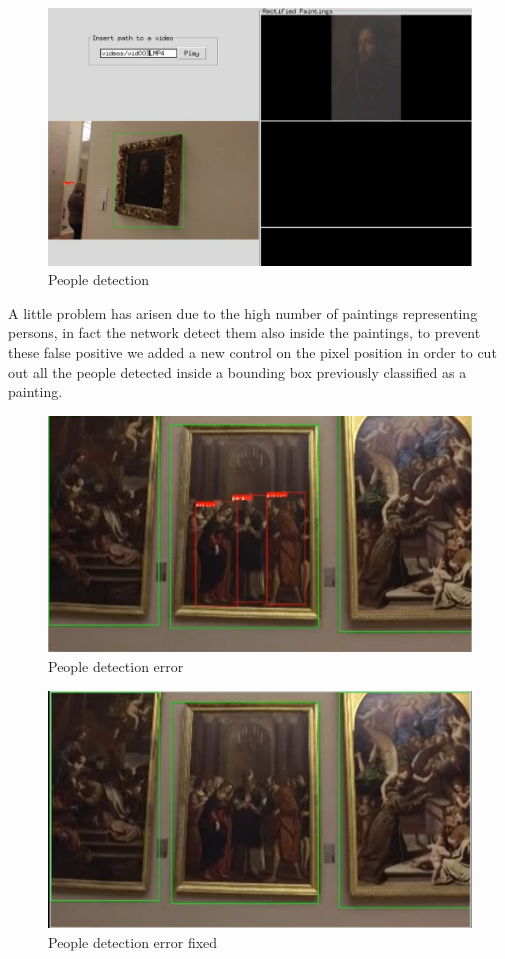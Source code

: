 \documentclass[conference]{IEEEtran}
\begin{document}
\begin{figure}[htbp]
\centerline{\includegraphics[width=0.8\columnwidth]{../people_detection/paint_and_person.png}}
\caption{People detection}
\label{fig_People_detection}
\end{figure}

A little problem has arisen due to the high number of paintings representing persons, in fact the network detect them also inside the paintings, to prevent these false positive we added a new control on the pixel position in order to cut out all the people detected inside a bounding box previously classified as a painting.

\begin{figure}[htbp]
\centerline{\includegraphics[width=0.8\columnwidth]{../people_detection/people_error.png}}
\caption{People detection error}
\label{fig_People_detection_error}
\end{figure}

\begin{figure}[htbp]
\centerline{\includegraphics[width=0.8\columnwidth]{../people_detection/people_error_fixed.png}}
\caption{People detection error fixed}
\label{fig_People_detection_error_fixed}
\end{figure}
\end{document}
